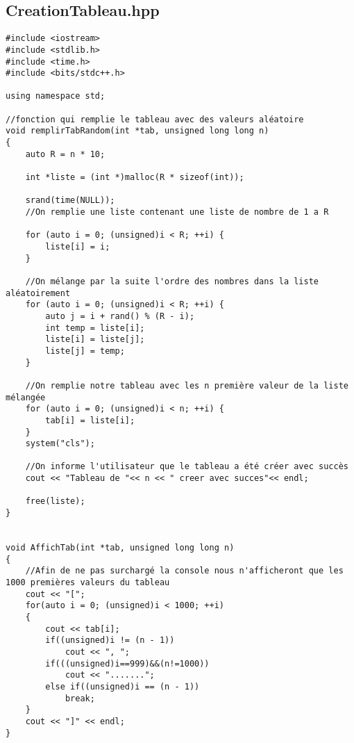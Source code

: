 \subsection{CreationTableau.hpp}
\begin{verbatim}
#include <iostream>
#include <stdlib.h>
#include <time.h>
#include <bits/stdc++.h>

using namespace std;

//fonction qui remplie le tableau avec des valeurs aléatoire
void remplirTabRandom(int *tab, unsigned long long n)
{
    auto R = n * 10;

    int *liste = (int *)malloc(R * sizeof(int));

    srand(time(NULL));
    //On remplie une liste contenant une liste de nombre de 1 a R

    for (auto i = 0; (unsigned)i < R; ++i) {
        liste[i] = i;
    }

    //On mélange par la suite l'ordre des nombres dans la liste aléatoirement
    for (auto i = 0; (unsigned)i < R; ++i) {
        auto j = i + rand() % (R - i);
        int temp = liste[i];
        liste[i] = liste[j];
        liste[j] = temp;
    }

    //On remplie notre tableau avec les n première valeur de la liste mélangée
    for (auto i = 0; (unsigned)i < n; ++i) {
        tab[i] = liste[i];
    }
    system("cls");

    //On informe l'utilisateur que le tableau a été créer avec succès
    cout << "Tableau de "<< n << " creer avec succes"<< endl;

    free(liste);
}


void AffichTab(int *tab, unsigned long long n)
{
    //Afin de ne pas surchargé la console nous n'afficheront que les 1000 premières valeurs du tableau
    cout << "[";
    for(auto i = 0; (unsigned)i < 1000; ++i)
    {
        cout << tab[i];
        if((unsigned)i != (n - 1))
            cout << ", ";
        if(((unsigned)i==999)&&(n!=1000))
            cout << ".......";
        else if((unsigned)i == (n - 1))
            break;
    }
    cout << "]" << endl;
}
\end{verbatim}

